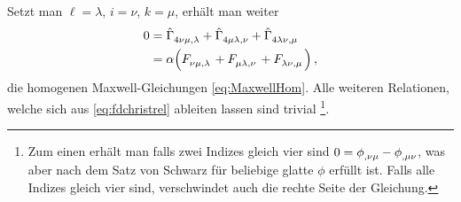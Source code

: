 Setzt man $\ell = \lambda$, $i=\nu$, $k = \mu$, erhält man weiter 
\begin{equation}
\begin{split}
0&=\tensor*{\hat{\Gamma}}{_4_\nu_\mu_{,\lambda}}
+\tensor*{\hat{\Gamma}}{_4_\mu_\lambda_{,\nu}}
+\tensor*{\hat{\Gamma}}{_4_\lambda_\nu_{,\mu}}\\
&=\alpha\left(\tensor{F}{_\nu_\mu_{,\lambda}}
+\tensor{F}{_\mu_\lambda_{,\nu}}
+\tensor{F}{_\lambda_\nu_{,\mu}}\right)\,,
\end{split}
\end{equation}
die homogenen Maxwell-Gleichungen \eqref{eq:MaxwellHom}. Alle weiteren
Relationen, welche sich aus \eqref{eq:fdchristrel} ableiten lassen sind
trivial
\footnote{Zum einen erhält man falls zwei Indizes gleich vier sind
$0=\tensor{\phi}{_{,\nu\mu}}-\tensor{\phi}{_{,\mu\nu}}$, was aber nach dem
Satz von Schwarz für beliebige glatte $\phi$ erfüllt ist. Falls alle
Indizes gleich vier sind, verschwindet auch die rechte Seite der Gleichung.}.

